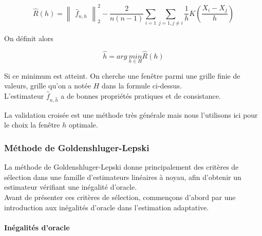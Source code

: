 \documentclass[
]{book}
\begin{document}
\[
\hat{R}(h)=\begin{Vmatrix}\hat{f}_{n,h}\end{Vmatrix}_2^2-\frac{2}{n(n-1)}\sum_{i=1}\sum_{j=1,j\ne i}\frac{1}{h}K(\frac{X_i-X_j}{h})
\]

On définit alors

\[
\hat{h} = arg\ \underset{h\in H}{min}\hat{R}(h)
\]

Si ce minimum est atteint. On cherche une fenêtre parmi une grille finie de valeurs, grille qu'on a notée \(H\) dans la formule ci-dessus.\\
L'estimateur \(\hat{f}_{n,\hat{h}}\) a de bonnes propriétés pratiques et de consistance.

La validation croisée est une méthode très générale mais nous l'utilisons ici pour le choix la fenêtre \(h\) optimale.

\hypertarget{muxe9thode-de-goldenshluger-lepski}{%
\subsubsection{Méthode de Goldenshluger-Lepski}\label{muxe9thode-de-goldenshluger-lepski}}

La méthode de Goldenshluger-Lepski donne principalement des critères de sélection dans une famille d'estimateurs linéaires à noyau, afin d'obtenir un estimateur vérifiant une inégalité d'oracle.\\
Avant de présenter ces critères de sélection, commençons d'abord par une introduction aux inégalités d'oracle dans l'estimation adaptative.

\hypertarget{inuxe9galituxe9s-doracle}{%
\paragraph{Inégalités d'oracle}\label{inuxe9galituxe9s-doracle}}
\end{document}
